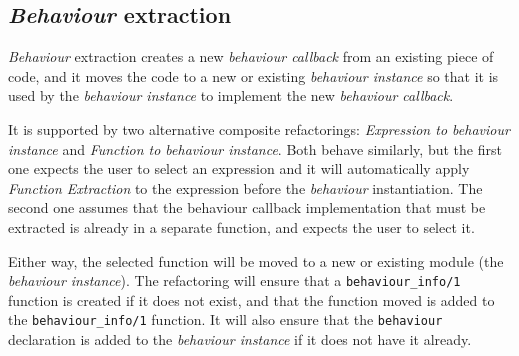 \subsection{\emph{Behaviour} extraction\label{sec:behaviour-extraction}}

\emph{Behaviour} extraction creates a new \emph{behaviour callback} from an existing
piece of code, and it moves the code to a new or existing \emph{behaviour instance} so
that it is used by the \emph{behaviour instance} to implement the new
\emph{behaviour callback}.

It is supported by two alternative composite refactorings: \emph{Expression
to behaviour instance} and \emph{Function to behaviour instance}. Both
behave similarly, but the first one expects the user to select an expression
and it will automatically apply \emph{Function Extraction} to the expression
before the \emph{behaviour} instantiation. The second one assumes that the
behaviour callback implementation that must be extracted is already in a
separate function, and expects the user to select it.

Either way, the selected function will be moved to a new or existing
module (the \emph{behaviour instance}). The refactoring will ensure
that a \texttt{behaviour\_info/1} function is created if it does not
exist, and that the function moved is added to the \texttt{behaviour\_info/1}
function. It will also ensure that the \texttt{behaviour} declaration
is added to the \emph{behaviour instance} if it does not have it already. 

